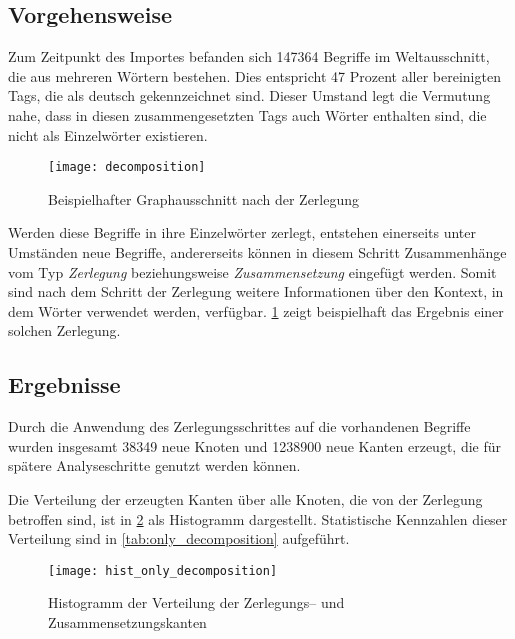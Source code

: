 \subsection{Vorgehensweise}

Zum Zeitpunkt des Importes befanden sich \num{147364} Begriffe im Weltausschnitt, die aus mehreren Wörtern bestehen. Dies entspricht \num{47} Prozent aller bereinigten Tags, die als deutsch gekennzeichnet sind. Dieser Umstand legt die Vermutung nahe, dass in diesen zusammengesetzten Tags auch Wörter enthalten sind, die nicht als Einzelwörter existieren.

\begin{figure}[h]
\centering
\texttt{[image: decomposition]}
\caption{Beispielhafter Graphausschnitt nach der Zerlegung}
\label{fig:decomposition}
\end{figure}

Werden diese Begriffe in ihre Einzelwörter zerlegt, entstehen einerseits unter Umständen neue Begriffe, andererseits können in diesem Schritt Zusammenhänge vom Typ \emph{Zerlegung} beziehungsweise \emph{Zusammensetzung} eingefügt werden. Somit sind nach dem Schritt der Zerlegung weitere Informationen über den Kontext, in dem Wörter verwendet werden, verfügbar. \cref{fig:decomposition} zeigt beispielhaft das Ergebnis einer solchen Zerlegung.

\subsection{Ergebnisse}

Durch die Anwendung des Zerlegungsschrittes auf die vorhandenen Begriffe wurden insgesamt \num{38349} neue Knoten und \num{1238900} neue Kanten erzeugt, die für spätere Analyseschritte genutzt werden können.

Die Verteilung der erzeugten Kanten über alle Knoten, die von der Zerlegung betroffen sind, ist in \cref{fig:hist_only_decomposition} als Histogramm dargestellt. Statistische Kennzahlen dieser Verteilung sind in \cref{tab:only_decomposition} aufgeführt.

\begin{figure}[h]
\centering
\texttt{[image: hist\_only\_decomposition]}
\caption{Histogramm der Verteilung der Zerlegungs-- und Zusammensetzungskanten}
\label{fig:hist_only_decomposition}
\end{figure}

